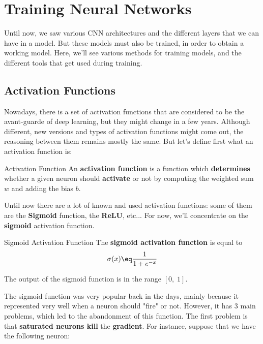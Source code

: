 \chapter{Training Neural Networks}

Until now, we saw various CNN architectures and the different layers that we can have in a model. But these models must also be trained, in order to obtain a working model. Here, we'll see various methods for training models, and the different tools that get used during training.

\section{Activation Functions}

Nowadays, there is a set of activation functions that are considered to be the avant-guarde of deep learning, but they might change in a few years. Although different, new versions and types of activation functions might come out, the reasoning between them remains mostly the same. But let's define first what an activation function is:

\begin{definition}{Activation Function}
    An \textbf{activation function} is a function which \textbf{determines} whether a given neuron should \textbf{activate} or not by computing the weighted sum $w$ and adding the bias $b$.
\end{definition}

Until now there are a lot of known and used activation functions: some of them are the \textbf{Sigmoid} function, the \textbf{ReLU}, etc... For now, we'll concentrate on the \textbf{sigmoid} activation function.

\begin{definition}{Sigmoid Activation Function}
    The \textbf{sigmoid activation function} is equal to
    \[ \sigma(x) \eq \frac{1}{1 + e^{-x}} \]

    The output of the sigmoid function is in the range $[0, \; 1]$.
\end{definition}

\noindent The sigmoid function was very popular back in the days, mainly because it represented very well when a neuron should "fire" or not. However, it has 3 main problems, which led to the abandonment of this function. The first problem is that \textbf{saturated neurons kill} the \textbf{gradient}. For instance, suppose that we have the following neuron:

